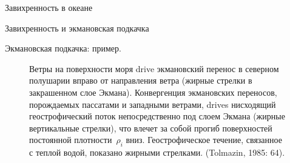 \begin{chapter}{Завихренность в океане}
\begin{section}{Завихренность и экмановская подкачка}
\begin{paragraph}{Экмановская подкачка: пример.}
\begin{figure}[t]
\caption{Ветры на поверхности моря drive 
экмановский перенос 
в северном полушарии вправо от направления ветра (жирные стрелки в 
закрашенном слое Экмана). 
Конвергенция экмановских переносов, порождаемых пассатами и
западными ветрами, drives нисходящий геострофический поток
непосредственно под слоем Экмана (жирные вертикальные стрелки), 
что влечет за собой прогиб поверхностей постоянной плотности~$\rho_i$ вниз.
Геострофическое течение, связанное с теплой водой, показано жирными стрелками.
(Tolmazin, 1985: 64).}
\label{fig:EkmanPumping}
\end{figure}
%


\end{paragraph}
\end{section}
\end{chapter}
